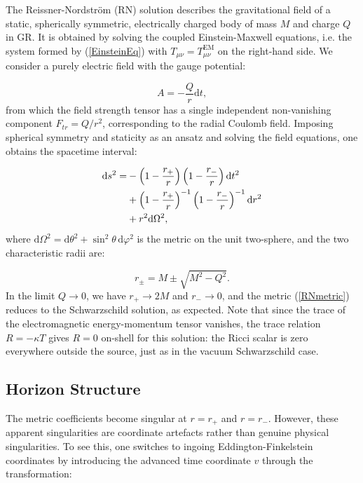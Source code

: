 \documentclass[floats,floatfix,aps, preprintnumbers,nofootinbib]{revtex4-2}
\newcommand{\paren}[1]{\left( #1 \right)}
\newcommand{\mrm}{\mathrm}
\begin{document}
The Reissner-Nordström (RN) solution describes the gravitational field of a static, spherically symmetric, electrically charged body of mass $M$ and charge $Q$ in GR. It is obtained by solving the coupled Einstein-Maxwell equations, i.e. the system formed by (\ref{EinsteinEq}) with $T_{\mu\nu} = T^{\mrm{EM}}_{\mu\nu}$ on the right-hand side. We consider a purely electric field with the gauge potential:

\begin{equation}
    A = -\frac{Q}{r}\mrm dt,
\end{equation}
from which the field strength tensor has a single independent non-vanishing component $F_{tr} = Q/r^2$, corresponding to the radial Coulomb field. Imposing spherical symmetry and staticity as an ansatz and solving the field equations, one obtains the spacetime interval:

\begin{align}\label{RNmetric}
    \mrm ds^2 = &-\paren{1-\frac{r_+}{r}}\paren{1 - \frac{r_-}{r}}\mrm dt^2\notag\\
    &+\paren{1 - \frac{r_+}{r}}^{-1}\paren{1 - \frac{r_-}{r}}^{-1}\mrm dr^2\notag\\
    &+ r^2\mrm d\Omega^2,
\end{align}
where $\mrm d\Omega^2 = \mrm d\theta^2 + \sin^2\theta\,\mrm d\varphi^2$ is the metric on the unit two-sphere, and the two characteristic radii are:

\begin{equation}\label{HorizonsRN}
    r_\pm = M \pm \sqrt{M^2 - Q^2}.
\end{equation}
In the limit $Q \to 0$, we have $r_+ \to 2M$ and $r_- \to 0$, and the metric (\ref{RNmetric}) reduces to the Schwarzschild solution, as expected. Note that since the trace of the electromagnetic energy-momentum tensor vanishes, the trace relation $R = -\kappa T$ gives $R = 0$ on-shell for this solution: the Ricci scalar is zero everywhere outside the source, just as in the vacuum Schwarzschild case.

\subsection{Horizon Structure}

The metric coefficients become singular at $r = r_+$ and $r = r_-$. However, these apparent singularities are coordinate artefacts rather than genuine physical singularities. To see this, one switches to ingoing Eddington-Finkelstein coordinates by introducing the advanced time coordinate $v$ through the transformation:
\end{document}
